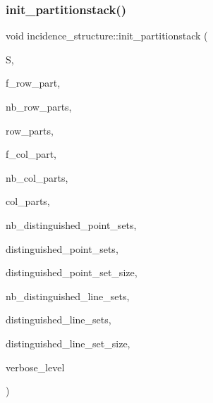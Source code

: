 \subsubsection{\texorpdfstring{init\+\_\+partitionstack()}{init\_partitionstack()}}
{\footnotesize\ttfamily void incidence\+\_\+structure\+::init\+\_\+partitionstack (\begin{DoxyParamCaption}\item[{\mbox{\hyperlink{classpartitionstack}{partitionstack}} $\ast$}]{S,  }\item[{\mbox{\hyperlink{galois_8h_a09fddde158a3a20bd2dcadb609de11dc}{I\+NT}}}]{f\+\_\+row\+\_\+part,  }\item[{\mbox{\hyperlink{galois_8h_a09fddde158a3a20bd2dcadb609de11dc}{I\+NT}}}]{nb\+\_\+row\+\_\+parts,  }\item[{\mbox{\hyperlink{galois_8h_a09fddde158a3a20bd2dcadb609de11dc}{I\+NT}} $\ast$}]{row\+\_\+parts,  }\item[{\mbox{\hyperlink{galois_8h_a09fddde158a3a20bd2dcadb609de11dc}{I\+NT}}}]{f\+\_\+col\+\_\+part,  }\item[{\mbox{\hyperlink{galois_8h_a09fddde158a3a20bd2dcadb609de11dc}{I\+NT}}}]{nb\+\_\+col\+\_\+parts,  }\item[{\mbox{\hyperlink{galois_8h_a09fddde158a3a20bd2dcadb609de11dc}{I\+NT}} $\ast$}]{col\+\_\+parts,  }\item[{\mbox{\hyperlink{galois_8h_a09fddde158a3a20bd2dcadb609de11dc}{I\+NT}}}]{nb\+\_\+distinguished\+\_\+point\+\_\+sets,  }\item[{\mbox{\hyperlink{galois_8h_a09fddde158a3a20bd2dcadb609de11dc}{I\+NT}} $\ast$$\ast$}]{distinguished\+\_\+point\+\_\+sets,  }\item[{\mbox{\hyperlink{galois_8h_a09fddde158a3a20bd2dcadb609de11dc}{I\+NT}} $\ast$}]{distinguished\+\_\+point\+\_\+set\+\_\+size,  }\item[{\mbox{\hyperlink{galois_8h_a09fddde158a3a20bd2dcadb609de11dc}{I\+NT}}}]{nb\+\_\+distinguished\+\_\+line\+\_\+sets,  }\item[{\mbox{\hyperlink{galois_8h_a09fddde158a3a20bd2dcadb609de11dc}{I\+NT}} $\ast$$\ast$}]{distinguished\+\_\+line\+\_\+sets,  }\item[{\mbox{\hyperlink{galois_8h_a09fddde158a3a20bd2dcadb609de11dc}{I\+NT}} $\ast$}]{distinguished\+\_\+line\+\_\+set\+\_\+size,  }\item[{\mbox{\hyperlink{galois_8h_a09fddde158a3a20bd2dcadb609de11dc}{I\+NT}}}]{verbose\+\_\+level }\end{DoxyParamCaption})}

